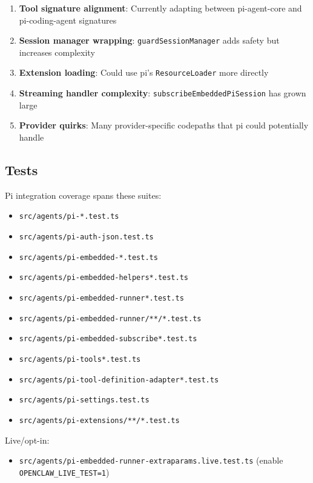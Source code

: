 \begin{enumerate}
  \item \textbf{Tool signature alignment}: Currently adapting between pi-agent-core and pi-coding-agent signatures
  \item \textbf{Session manager wrapping}: \texttt{guardSessionManager} adds safety but increases complexity
  \item \textbf{Extension loading}: Could use pi's \texttt{ResourceLoader} more directly
  \item \textbf{Streaming handler complexity}: \texttt{subscribeEmbeddedPiSession} has grown large
  \item \textbf{Provider quirks}: Many provider-specific codepaths that pi could potentially handle
\end{enumerate}


\subsection{Tests}


Pi integration coverage spans these suites:

\begin{itemize}
  \item \texttt{src/agents/pi-*.test.ts}
  \item \texttt{src/agents/pi-auth-json.test.ts}
  \item \texttt{src/agents/pi-embedded-*.test.ts}
  \item \texttt{src/agents/pi-embedded-helpers*.test.ts}
  \item \texttt{src/agents/pi-embedded-runner*.test.ts}
  \item \texttt{src/agents/pi-embedded-runner/**/*.test.ts}
  \item \texttt{src/agents/pi-embedded-subscribe*.test.ts}
  \item \texttt{src/agents/pi-tools*.test.ts}
  \item \texttt{src/agents/pi-tool-definition-adapter*.test.ts}
  \item \texttt{src/agents/pi-settings.test.ts}
  \item \texttt{src/agents/pi-extensions/**/*.test.ts}
\end{itemize}


Live/opt-in:

\begin{itemize}
  \item \texttt{src/agents/pi-embedded-runner-extraparams.live.test.ts} (enable \texttt{OPENCLAW\_LIVE\_TEST=1})
\end{itemize}


